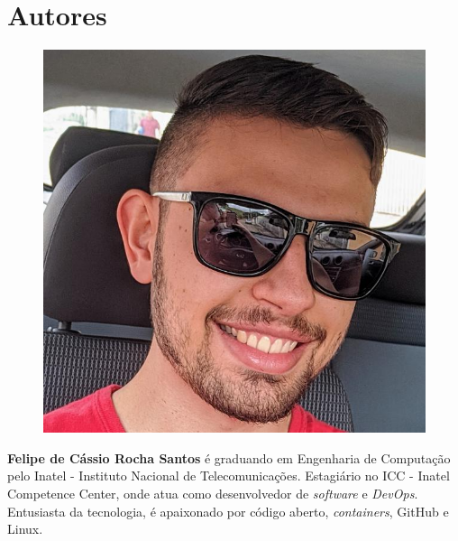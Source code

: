 \section*{Autores}

\begin{figure}
\includegraphics[width=\linewidth]{figuras/autor_felipe.jpg}
\end{figure}

\textbf{Felipe de Cássio Rocha Santos} é graduando em Engenharia de Computação pelo Inatel - Instituto Nacional de Telecomunicações. Estagiário no ICC - Inatel Competence Center, onde atua como desenvolvedor de \textit{software} e \textit{DevOps}. Entusiasta da tecnologia, é apaixonado por código aberto, \textit{containers}, GitHub e Linux.\newline

